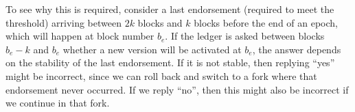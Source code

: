 To see why this is required, consider a last endorsement (required to meet the
threshold) arriving between $2k$ blocks and $k$ blocks before the end of an
epoch, which will happen at block number $b_e$. If the ledger is asked between
blocks $b_e - k$ and $b_e$ whether a new version will be activated at $b_e$, the
answer depends on the stability of the last endorsement. If it is not stable,
then replying ``yes'' might be incorrect, since we can roll back and switch to a
fork where that endorsement never occurred. If we reply ``no'', then this might
also be incorrect if we continue in that fork.

